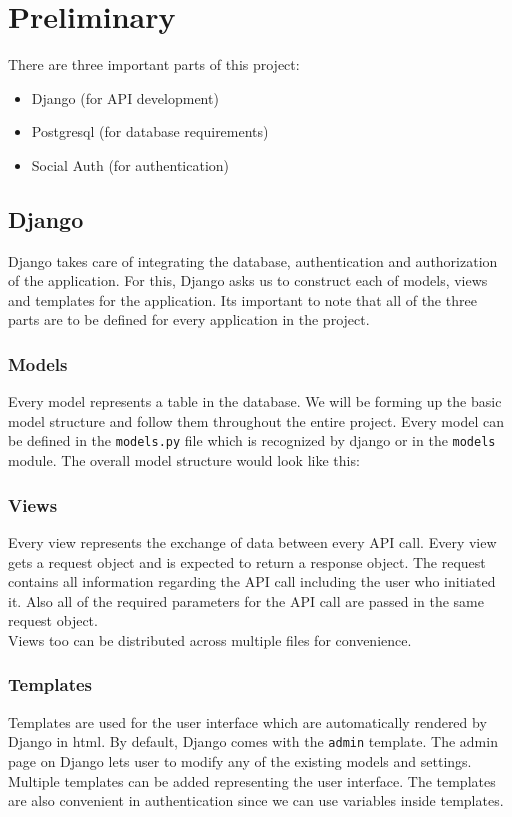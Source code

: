 \chapter{Preliminary}
There are three important parts of this project:
\begin{itemize}
    \item Django (for API development)
    \item Postgresql (for database requirements)
    \item Social Auth (for authentication)
\end{itemize}

\section{Django}
Django takes care of integrating the database, authentication and authorization
of the application. For this, Django asks us to construct each of models, views
and templates for the application. Its important to note that all of the three
parts are to be defined for every application in the project.

\subsection{Models}
Every model represents a table in the database. We will be forming up the
basic model structure and follow them throughout the entire project.
Every model can be defined in the \texttt{models.py} file which is recognized
by django or in the \texttt{models} module. The overall model structure would
look like this:


\subsection{Views}
Every view represents the exchange of data between every API call. Every view
gets a request object and is expected to return a response object. The request
contains all information regarding the API call including the user who
initiated it. Also all of the required parameters for the API call are passed
in the same request object.\\
Views too can be distributed across multiple files for convenience.

\subsection{Templates}
Templates are used for the user interface which are automatically rendered by
Django in html. By default, Django comes with the \texttt{admin} template.
The admin page on Django lets user to modify any of the existing models and
settings. Multiple templates can be added representing the user interface.
The templates are also convenient in authentication since we can use variables
inside templates.

